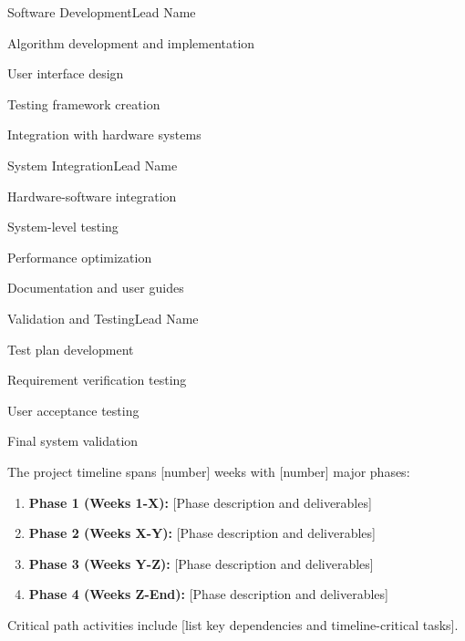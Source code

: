 \documentclass[final]{designreport}
\begin{document}
\begin{subproject}{Software Development}{Lead Name}
    \item Algorithm development and implementation
    \item User interface design
    \item Testing framework creation
    \item Integration with hardware systems
\end{subproject}

\begin{subproject}{System Integration}{Lead Name}
    \item Hardware-software integration
    \item System-level testing
    \item Performance optimization
    \item Documentation and user guides
\end{subproject}

\begin{subproject}{Validation and Testing}{Lead Name}
    \item Test plan development
    \item Requirement verification testing
    \item User acceptance testing
    \item Final system validation
\end{subproject}


The project timeline spans [number] weeks with [number] major phases:

\begin{enumerate}
    \item \textbf{Phase 1 (Weeks 1-X):} [Phase description and deliverables]
    \item \textbf{Phase 2 (Weeks X-Y):} [Phase description and deliverables]
    \item \textbf{Phase 3 (Weeks Y-Z):} [Phase description and deliverables]
    \item \textbf{Phase 4 (Weeks Z-End):} [Phase description and deliverables]
\end{enumerate}

Critical path activities include [list key dependencies and timeline-critical tasks].

\costanalysis
\end{document}
